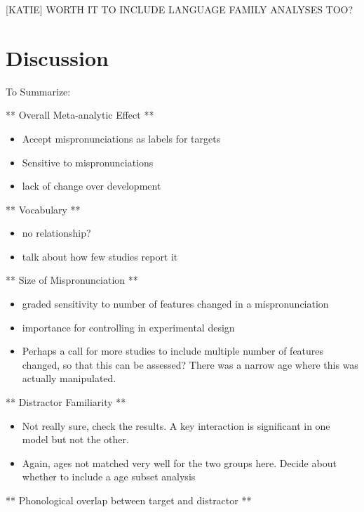 \documentclass[man]{apa6}
\providecommand{\tightlist}{%
  \setlength{\itemsep}{0pt}\setlength{\parskip}{0pt}}
\theoremstyle{definition}
\theoremstyle{definition}
\theoremstyle{definition}
\theoremstyle{remark}
\begin{document}
{[}KATIE{]} WORTH IT TO INCLUDE LANGUAGE FAMILY ANALYSES TOO?

\section{Discussion}\label{discussion}

To Summarize:

** Overall Meta-analytic Effect **

\begin{itemize}
\tightlist
\item
  Accept mispronunciations as labels for targets
\item
  Sensitive to mispronunciations
\item
  lack of change over development
\end{itemize}

** Vocabulary **

\begin{itemize}
\tightlist
\item
  no relationship?
\item
  talk about how few studies report it
\end{itemize}

** Size of Mispronunciation **

\begin{itemize}
\tightlist
\item
  graded sensitivity to number of features changed in a mispronunciation
\item
  importance for controlling in experimental design
\item
  Perhaps a call for more studies to include multiple number of features
  changed, so that this can be assessed? There was a narrow age where
  this was actually manipulated.
\end{itemize}

** Distractor Familiarity **

\begin{itemize}
\tightlist
\item
  Not really sure, check the results. A key interaction is significant
  in one model but not the other.
\item
  Again, ages not matched very well for the two groups here. Decide
  about whether to include a age subset analysis
\end{itemize}

** Phonological overlap between target and distractor **
\end{document}
